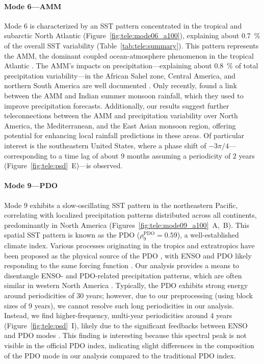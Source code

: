 \paragraph{Mode 6---AMM} 
Mode 6 is characterized by an SST pattern concentrated in the tropical and subarctic North Atlantic (Figure~\ref{fig:tele:mode06_a100}), explaining about \qty{0.7}{\percent} of the overall SST variability (Table~\ref{tab:tele:summary}). This pattern represents the AMM, the dominant coupled ocean-atmosphere phenomenon in the tropical Atlantic \cite{servain_relationship_1999}. The AMM's impacts on precipitation---explaining about \qty{0.8}{\percent} of total precipitation variability---in the African Sahel zone, Central America, and northern South America are well documented \cite{lamb_interannual_1986, martin_multidecadal_2014}. Only recently, \citet{vittal_early_2020} found a link between the AMM and Indian summer monsoon rainfall, which they used to improve precipitation forecasts. Additionally, our results suggest further teleconnections between the AMM and precipitation variability over North America, the Mediterranean, and the East Asian monsoon region, offering potential for enhancing local rainfall predictions in these areas. Of particular interest is the southeastern United States, where a phase shift of $-3\pi/4$---corresponding to a time lag of about 9 months assuming a periodicity of 2 years (Figure~\ref{fig:tele:psd}~E)---is observed.



\paragraph{Mode 9---PDO} 
Mode 9 exhibits a slow-oscillating SST pattern in the northeastern Pacific, correlating with localized precipitation patterns distributed across all continents, predominantly in North America (Figures~\ref{fig:tele:mode09_a100}~A,~B). This spatial SST pattern is known as the PDO \cite{mantua_pacific_1997} ($\rho_9^{\text{PDO}}=0.59$), a well-established climate index. Various processes originating in the tropics and extratropics have been proposed as the physical source of the PDO \cite{newman_pacific_2016}, with ENSO and PDO likely responding to the same forcing function \cite{pierce_role_2002}. Our analysis provides a means to disentangle ENSO- and PDO-related precipitation patterns, which are often similar in western North America \cite{hu_interferential_2009}. Typically, the PDO exhibits strong energy around periodicities of 30 years; however, due to our preprocessing (using block sizes of 9 years), we cannot resolve such long periodicities in our analysis. Instead, we find higher-frequency, multi-year periodicities around 4 years (Figure~\ref{fig:tele:psd}~I), likely due to the significant feedbacks between ENSO and PDO modes \cite{mills_seasonal_2013, tang_positive_2024}. This finding is interesting because this spectral peak is not visible in the official PDO index, indicating slight differences in the composition of the PDO mode in our analysis compared to the traditional PDO index.


